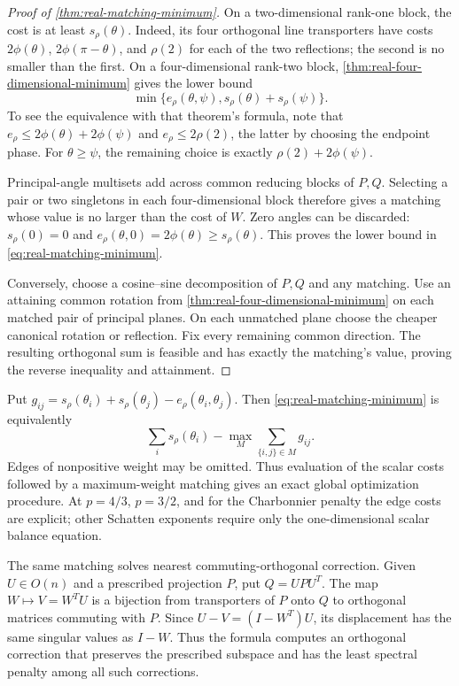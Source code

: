 \begin{proof}[Proof of \cref{thm:real-matching-minimum}]
On a two-dimensional rank-one block, the cost is at least
$s_\rho(\theta)$. Indeed, its four orthogonal line transporters have
costs $2\phi(\theta)$, $2\phi(\pi-\theta)$, and $\rho(2)$ for
each of the two reflections; the second is no smaller than the first.
On a four-dimensional rank-two block, \cref{thm:real-four-dimensional-minimum}
gives the lower bound
\[
 \min\{e_\rho(\theta,\psi),
                 s_\rho(\theta)+s_\rho(\psi)\}.
\]
To see the equivalence with that theorem's formula, note that
$e_\rho\leq2\phi(\theta)+2\phi(\psi)$ and
$e_\rho\leq2\rho(2)$, the latter by choosing the endpoint phase.
For $\theta\geq\psi$, the remaining choice is exactly
$\rho(2)+2\phi(\psi)$.

Principal-angle multisets add across common reducing blocks of $P,Q$.
Selecting a pair or two singletons in each four-dimensional block
therefore gives a matching whose value is no larger than the cost of
$W$. Zero angles can be discarded: $s_\rho(0)=0$ and
$e_\rho(\theta,0)=2\phi(\theta)\geq s_\rho(\theta)$.
This proves the lower bound in \cref{eq:real-matching-minimum}.

Conversely, choose a cosine--sine decomposition of $P,Q$ and any matching.
Use an attaining common rotation from
\cref{thm:real-four-dimensional-minimum} on each matched pair of principal
planes. On each unmatched plane choose the cheaper canonical rotation
or reflection. Fix every remaining common direction. The resulting
orthogonal sum is feasible and has exactly the matching's value,
proving the reverse inequality and attainment.
\end{proof}

Put $g_{ij}=s_\rho(\theta_i)+s_\rho(\theta_j)-e_\rho(\theta_i,\theta_j)$.
Then \cref{eq:real-matching-minimum} is equivalently
\[
 \sum_i s_\rho(\theta_i)-\max_M\sum_{\{i,j\}\in M}g_{ij}.
\]
Edges of nonpositive weight may be omitted. Thus evaluation of the scalar
costs followed by a maximum-weight matching gives an exact global
optimization procedure. At $p=4/3$, $p=3/2$, and for the Charbonnier penalty the
edge costs are explicit; other Schatten exponents require only the
one-dimensional scalar balance equation.

The same matching solves nearest commuting-orthogonal correction. Given
$U\in O(n)$ and a prescribed projection $P$, put $Q=UPU^T$. The map
$W\mapsto V=W^TU$ is a bijection from transporters of $P$ onto $Q$
to orthogonal matrices commuting with $P$. Since
$U-V=(I-W^T)U$, its displacement has the same singular values as
$I-W$. Thus the formula computes an orthogonal correction that preserves
the prescribed subspace and has the least spectral penalty among all
such corrections.

